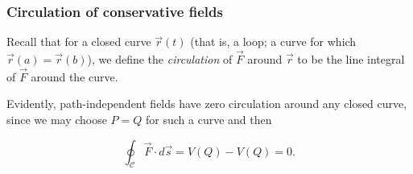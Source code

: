\documentclass[11pt,ignorenonframetext,aspectratio=169,xcolor={svgnames}]{beamer}
\begin{document}
\begin{frame}\frametitle{Circulation of conservative fields}

Recall that for a closed curve $\vec{r}(t)$ (that is, a loop; a curve
for which $\vec{r}(a) = \vec{r}(b)$), we define the \emph{circulation}
of $\vec{F}$ around $\vec{r}$ to be the line integral of $\vec{F}$
around the curve.

Evidently, path-independent fields have zero circulation around any
closed curve, since we may choose $P = Q$ for such a curve and then

\[ \oint_{\mathcal{C}} \vec{F} \cdot d\vec{s} = V(Q) - V(Q) = 0. \]

\end{frame}
\end{document}

